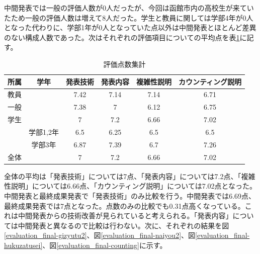 中間発表では一般の評価人数が0人だったが、今回は函館市内の高校生が来ていたため一般の評価人数は増えて8人だった。学生と教員に関しては学部4年が0人となった代わりに、学部1年が0人となっていた点以外は中間発表とほとんど差異のない構成人数であった。次はそれぞれの評価項目についての平均点を表\ref{tab:point2}に記す。
\begin{table}[H]
\begin{center}
\caption{評価点数集計}
\begin{tabular}{|c|c|c|c|c|c|} \hline
  所属 & 学年 & 発表技術 & 発表内容 & 複雑性説明 & カウンティング説明  \\ \hline \hline
  教員 &        & 7.42 & 7.14 & 7.14 & 6.71 \\ 
  一般 &        & 7.38 & 7 & 6.12 & 6.75 \\
  学生 &        & 7 & 7.2 & 6.66 & 7.02 \\
         & 学部1,2年 & 6.5 & 6.25 & 6.5 & 6.5 \\
         & 学部3年 & 6.87 & 7.39 & 6.7 & 7.26 \\ \hline \hline
  全体 &        & 7 & 7.2 & 6.66 & 7.02 \\ \hline
\end{tabular}
\label{tab:point2}
\end{center}
\end{table}

全体の平均は「発表技術」については7点、「発表内容」については7.2点、「複雑性説明」については6.66点、「カウンティング説明」については7.02点となった。中間発表と最終成果発表で「発表技術」のみ比較を行う。中間発表では6.69点、最終成果発表では7点となった。点数のみの比較でも0.31点高くなっている。これは中間発表からの技術改善が見られていると考えられる。「発表内容」については中間発表と異なるので比較は行わない。次に、それぞれの結果を図\ref{evaluation_final-gizyutu2}、図\ref{evaluation_final-naiyou2}、図\ref{evaluation_final-hukuzatusei}、図\ref{evaluation_final-counting}に示す。


